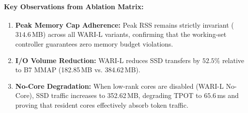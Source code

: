 \documentclass[11pt,a4paper]{article}
\begin{document}
\begin{table}[htbp]
\centering
\small
{}
\caption{Comprehensive ablation matrix over seeds 0--4 (mean $\pm$ std) [\texttt{exp: results/raw/exp3/}].}
\label{tab:ablation}
\end{table}

\paragraph{Key Observations from Ablation Matrix:}
\begin{enumerate}
    \item \textbf{Peak Memory Cap Adherence:} Peak RSS remains strictly invariant ($314.6$\,MB) across all WARI-L variants, confirming that the working-set controller guarantees zero memory budget violations.
    \item \textbf{I/O Volume Reduction:} WARI-L reduces SSD transfers by $52.5\%$ relative to B7 MMAP (182.85\,MB vs. 384.62\,MB).
    \item \textbf{No-Core Degradation:} When low-rank cores are disabled (WARI-L No-Core), SSD traffic increases to 352.62\,MB, degrading TPOT to $65.6$\,ms and proving that resident cores effectively absorb token traffic.
\end{enumerate}
\end{document}
